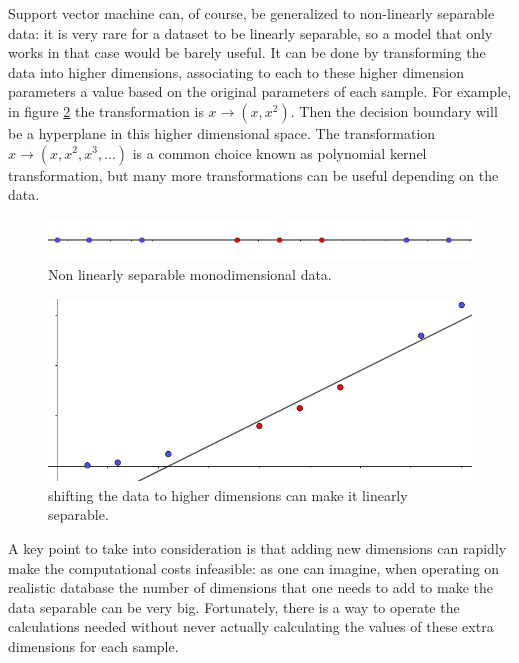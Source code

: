 \documentclass[a4paper]{report}
\begin{document}
Support vector machine can, of course, be generalized to non-linearly separable data:
it is very rare for a dataset to be linearly separable, so a model that only works in that case would be barely useful.
It can be done by transforming the data into higher dimensions, associating to each to these higher dimension parameters a value based on the original parameters of each sample.
For example, in figure \ref{2dim} the transformation is $x \xrightarrow{}(x,x^2)$.
Then the decision boundary will be a hyperplane in this higher dimensional space.
The transformation $x \xrightarrow{} (x, x^2, x^3, ...)$ is a common choice known as polynomial kernel transformation, but many more transformations can be useful depending on the data.

\begin{figure} [H]
    \centering
    \includegraphics [width=\textwidth ]{svm/1dim_ns.png}
    \caption{Non linearly separable monodimensional data.}
    \label{1dim_ns}
\end{figure}

\begin{figure} [H]
    \centering
    \includegraphics [width=\textwidth ]{svm/2dim.png}
    \caption{shifting the data to higher dimensions can make it linearly separable.}
    \label{2dim}
\end{figure}

A key point to take into consideration is that adding new dimensions can rapidly make the computational costs infeasible: as one can imagine, when operating on realistic database the number of dimensions that one needs to add to make the data separable can be very big.
Fortunately, there is a way to operate the calculations needed without never actually calculating the values of these extra dimensions for each sample.
\end{document}
